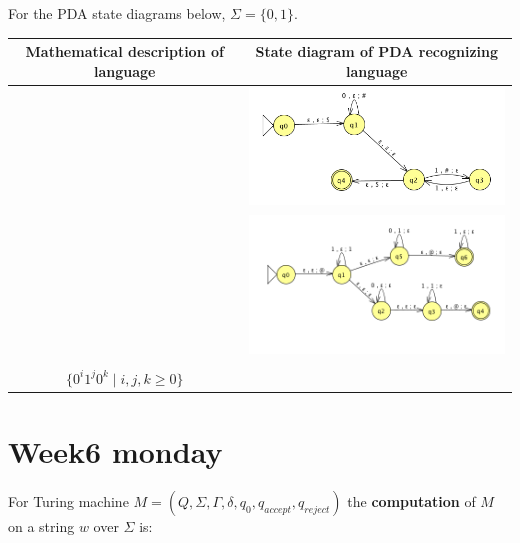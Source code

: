 \documentclass[12pt, oneside]{article}
\begin{document}
For the PDA state diagrams below, $\Sigma = \{0,1\}$.


\begin{center}
\begin{tabular}{c c}
Mathematical description of language & State diagram of PDA recognizing language\\
\hline
& \includegraphics[width=3.5in]{../../resources/machines/Lect10PDA1.png}\\
\hline
& \includegraphics[width=3.5in]{../../resources/machines/Lect10PDA2.png}\\
\hline
& \\
$\{ 0^i 1^j 0^k \mid i,j,k \geq 0 \}$ & \\
\end{tabular}
\end{center}
 \vfill
\section*{Week6 monday}


For Turing machine $M= (Q, \Sigma, \Gamma, \delta, q_0, q_{accept}, q_{reject})$ 
the {\bf computation} of $M$ on a string $w$ over $\Sigma$  is:

\vspace{-20pt}
\end{document}
